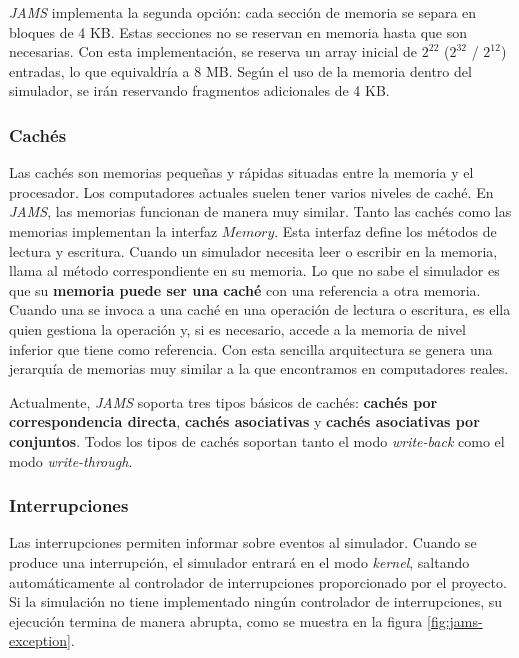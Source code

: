 \textit{JAMS} implementa la segunda opción:
cada sección de memoria se separa en bloques de 4 KB\@.
Estas secciones no se reservan en memoria
hasta que son necesarias.
Con esta implementación, se reserva un array inicial de
$2^{22}$ ($2^{32}$ / $2^{12}$) entradas, lo que equivaldría
a 8 MB\@.
Según el uso de la memoria dentro del simulador,
se irán reservando fragmentos adicionales de 4 KB\@.

\subsubsection{Cachés}\label{subsubsec:caches}

Las cachés son memorias pequeñas y rápidas situadas entre
la memoria y el procesador.
Los computadores actuales suelen tener varios niveles de caché.
En \textit{JAMS}, las memorias funcionan de manera muy similar.
Tanto las cachés como las memorias implementan la interfaz $Memory$.
Esta interfaz define los métodos de lectura y escritura.
Cuando un simulador necesita leer o escribir en la memoria,
llama al método correspondiente en su memoria.
Lo que no sabe el simulador es que su \textbf{memoria puede ser una caché}
con una referencia a otra memoria.
Cuando una se invoca a una caché en una operación de lectura o escritura,
es ella quien gestiona la operación y,
si es necesario, accede a la memoria de nivel inferior que tiene como referencia.
Con esta sencilla arquitectura se genera una jerarquía de memorias
muy similar a la que encontramos en computadores reales.

Actualmente, \textit{JAMS} soporta tres tipos básicos
de cachés: \textbf{cachés por correspondencia directa},
\textbf{cachés asociativas} y \textbf{cachés asociativas por conjuntos}.
Todos los tipos de cachés soportan tanto el modo \textit{write-back}
como el modo \textit{write-through}.

\subsubsection{Interrupciones}\label{subsubsec:interrupciones}

Las interrupciones permiten informar sobre eventos al
simulador.
Cuando se produce una interrupción, el simulador entrará en el
modo \textit{kernel}, saltando automáticamente al controlador
de interrupciones proporcionado por el proyecto.
Si la simulación no tiene implementado ningún controlador de
interrupciones, su ejecución termina de manera abrupta,
como se muestra en la figura \ref{fig:jams-exception}.


